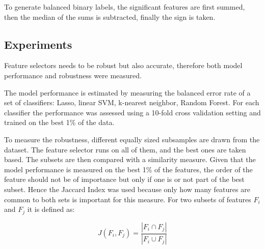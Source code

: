 \documentclass[twoside,11pt]{article}
\begin{document}
To generate balanced binary labels, the significant features are first summed, then the median of the sums is subtracted, finally the sign is taken. 





\subsection{Experiments}

Feature selectors needs to be robust but also accurate, therefore both model performance and robustness were measured.

The model performance is estimated by measuring the balanced error rate of a set of classifiers: Lasso, linear SVM, k-nearest neighbor, Random Forest. For each classifier the performance was assessed using a 10-fold cross validation setting and trained on the best 1\% of the data.

To measure the robustness, different equally sized subsamples are drawn from the dataset. The feature selector runs on all of them, and the best ones are taken based. The subsets are then compared with a similarity measure. Given that the model performance is measured on the best 1\% of the features, the order of the feature should not be of importance but only if one is or not part of the best subset. Hence the Jaccard Index was used because only how many features are common to both sets is important for this measure. For two subsets of features $F_i$ and $F_j$ it is defined as:

\begin{equation}
J(F_i, F_j) = \frac{| F_i \cap F_j |}{| F_i \cup F_j |}
\end{equation}
\end{document}
